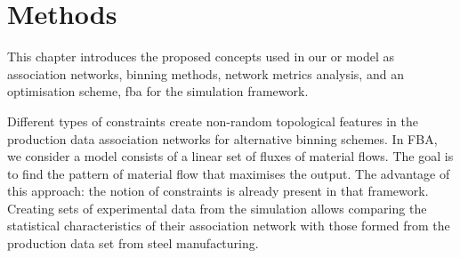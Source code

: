 \chapter{Methods}
This chapter introduces the proposed concepts used in our \acs{or} model as association networks, binning methods, network metrics analysis, and an optimisation scheme, \acf{fba} for the simulation framework.

Different types of constraints create non-random topological features in the production data association networks for alternative binning schemes. In FBA, we consider a model consists of a linear set of fluxes of material flows. The goal is to find the pattern of material flow that maximises the output. The advantage of this approach: the notion of constraints is already present in that framework. Creating sets of experimental data from the simulation allows comparing the statistical characteristics of their association network with those formed from the production data set from steel manufacturing.



